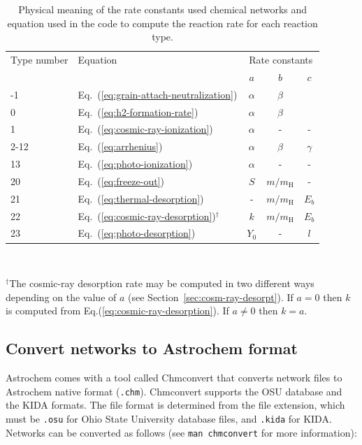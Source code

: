 \documentclass[a4paper,12pt]{article}
\begin{document}
\begin{table}
    \renewcommand{\footnoterule}{}  
    \begin{center}
      \caption{Physical meaning of the rate constants used chemical
        networks and equation used in the code to compute the reaction
        rate for each reaction type.}
      \begin{tabular}{llccc}
        \hline
        \hline
        Type number & Equation & \multicolumn{3}{c}{Rate constants}\\
        \cline{3-5}
        & & $a$ & $b$ & $c$\\
        \hline
        -1    & Eq.~(\ref{eq:grain-attach-neutralization}) & $\alpha$ & $\beta$\\
        0     & Eq.~(\ref{eq:h2-formation-rate}) & $\alpha$ & $\beta$\\
        1     & Eq.~(\ref{eq:cosmic-ray-ionization}) & $\alpha$ & - & -\\
        2-12  & Eq.~(\ref{eq:arrhenius}) & $\alpha$ & $\beta$ & $\gamma$\\
        13    & Eq.~(\ref{eq:photo-ionization}) & $\alpha$ & - & -\\
        20    & Eq.~(\ref{eq:freeze-out}) & $S$ & $m/m_\mathrm{H}$ & -\\
        21    & Eq.~(\ref{eq:thermal-desorption}) & - & $m/m_\mathrm{H}$ & $E_{b}$\\
        22    & Eq.~(\ref{eq:cosmic-ray-desorption})$^\dagger$ & $k$ & $m/m_\mathrm{H}$ & $E_{b}$\\
        23    & Eq.~(\ref{eq:photo-desorption}) & $Y_{0}$ & - & $l$\\
        \hline
    \end{tabular}
    \\ \parbox{12cm}{\footnotesize $^\dagger$The cosmic-ray desorption
      rate may be computed in two different ways depending on the
      value of $a$ (see Section~\ref{sec:cosm-ray-desorpt}). If $a =
      0$ then $k$ is computed from
      Eq.(\ref{eq:cosmic-ray-desorption}). If $a \ne 0$ then $k = a$.}
    \label{tab:rate-const-meaning}
  \end{center}
\end{table}

\subsection{Convert networks to Astrochem format}
\label{sec:conv-netw-astr}

Astrochem comes with a tool called Chmconvert that converts network
files to Astrochem native format (\verb=.chm=). Chmconvert supports
the OSU database and the KIDA formats. The file format is determined
from the file extension, which must be \verb=.osu= for Ohio State
University database files, and \verb=.kida= for KIDA. Networks can be
converted as follows (see \verb=man chmconvert= for more information):
\end{document}
